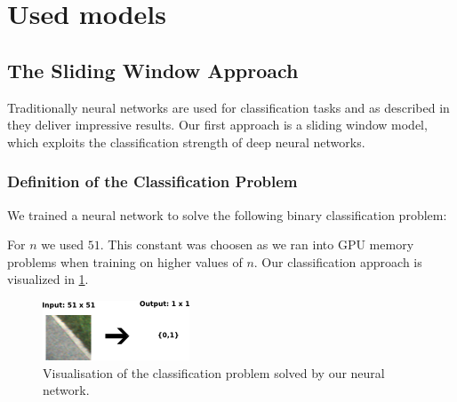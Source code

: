 
\section{Used models}\label{sec:model}

\subsection{The Sliding Window Approach}

Traditionally neural networks are used for classification tasks and as described in  they deliver impressive results. Our first approach is a sliding window model, which exploits the classification strength of deep neural networks.

\subsubsection{Definition of the Classification Problem}

We trained a neural network to solve the following binary classification problem:


For $n$ we used $51$. This constant was choosen as we ran into GPU memory problems when training on higher values of $n$. Our classification approach is visualized in \cref{fig:figure}.

\begin{figure}[H]
	\centering
	\includegraphics[width=0.5\columnwidth]{figures/models/sliding_window.png}
	\caption{Visualisation of the classification problem solved by our neural network.}
	\label{fig:figure}
\end{figure}


